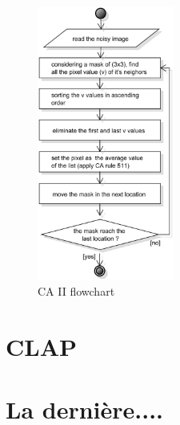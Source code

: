 \begin{figure}[ht]
	\centering
	\includegraphics[width=0.4\textwidth]{images/diagrams/flowchart_CAII}
	\caption{CA II flowchart \cite{bib:filter:CA}}
	\label{fig:diagram:flowchart:CAII}
\end{figure}







\section{CLAP}



\section{La dernière....}
